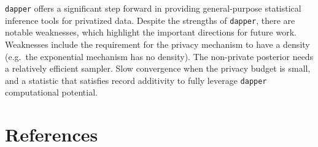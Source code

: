 \texttt{dapper} offers a significant step forward in providing general-purpose statistical
inference tools for privatized data. Despite the strengths of \texttt{dapper}, there
are notable weaknesses, which highlight the important directions for future work.
Weaknesses include the requirement for the privacy mechanism to have a density
(e.g.~the exponential mechanism has no density). The non-private posterior needs
a relatively efficient sampler. Slow convergence when the privacy budget is small,
and a statistic that satisfies record additivity to fully leverage \texttt{dapper} computational
potential.

\hypertarget{references}{%
\section*{References}\label{references}}

